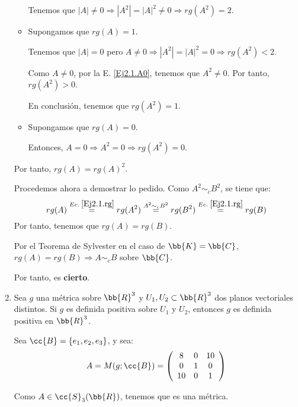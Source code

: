 \documentclass[12pt]{article}
\begin{document}
\begin{ejercicio}
\begin{enumerate}
\begin{itemize}
            Tenemos que $|A|\neq 0 \Longrightarrow |A^2| = |A|^2 \neq 0 \Longrightarrow rg(A^2)=2$.

            \item Supongamos que $rg(A)=1$.

            Tenemos que $|A|=0$ pero $A\neq 0 \Longrightarrow |A^2| = |A|^2 = 0 \Longrightarrow rg(A^2)<2$.

            Como $A\neq 0$, por la E. \ref{Ej2.1.A0}, tenemos que $ A^2 \neq 0$. Por tanto, $rg(A^2)>0$.

            En conclusión, tenemos que $rg(A^2) = 1$.

            \item Supongamos que $rg(A)=0$.

            Entonces, $A=0\Longrightarrow A^2=0 \Longrightarrow rg(A^2)=0$.
        \end{itemize}
        Por tanto, $rg(A)=rg(A)^2$.

        Procedemos ahora a demostrar lo pedido. Como $A^2\sim_c B^2$, se tiene que:
        \begin{equation*}
            rg(A)\stackrel{Ec.\;\ref{Ej2.1.rg}}{=} rg(A^2) \stackrel{A^2\sim_c B^2}{=} rg(B^2) \stackrel{Ec.\;\ref{Ej2.1.rg}}{=} rg(B)
        \end{equation*}
        Por tanto, tenemos que $rg(A)=rg(B)$.

        Por el Teorema de Sylvester en el caso de $\bb{K}=\bb{C}$, $rg(A)=rg(B)\Longrightarrow A\sim_c B$ sobre $\bb{C}$.

        Por tanto, es \textbf{cierto}.

        \item Sea $g$ una métrica sobre $\bb{R}^3$ y $U_1, U_2 \subset \bb{R}^3$ dos planos vectoriales distintos. Si $g$ es definida positiva sobre $U_1$ y $U_2$, entonces $g$ es definida positiva en $\bb{R}^3$.

        Sea $\cc{B}=\{e_1, e_2, e_3\}$, y sea:
        \begin{equation*}
            A=M(g; \cc{B}) = \left(\begin{array}{ccc}
                8 & 0 & 10 \\
                0 & 1 & 0 \\
                10 & 0 & 1
            \end{array}\right)
        \end{equation*}

        Como $A\in \cc{S}_3(\bb{R})$, tenemos que es una métrica.


\end{enumerate}
\end{ejercicio}
\end{document}
